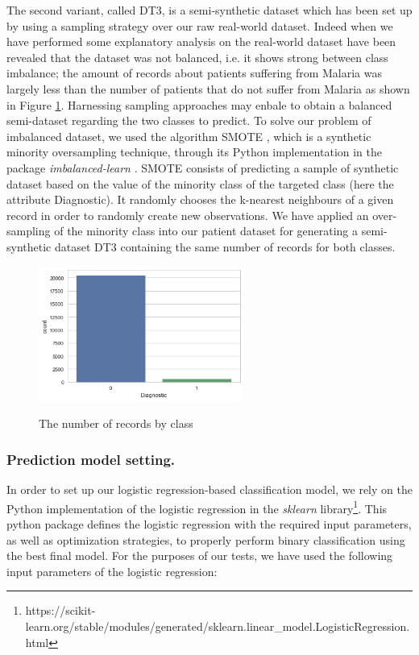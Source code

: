 The second variant, called \textsc{DT3}, is a semi-synthetic dataset which has been set up by using a 
sampling strategy over our raw real-world dataset. Indeed when we have performed some explanatory analysis 
on the real-world dataset have been revealed that the dataset was not balanced, i.e. it shows strong between
class imbalance; the amount of records about patients suffering from Malaria was largely less than the number
of patients that do not suffer from Malaria as shown in Figure \ref{records_class}. Harnessing sampling approaches may enbale to obtain a balanced 
semi-dataset regarding the two classes to predict. To solve our problem of imbalanced dataset, we used the 
algorithm SMOTE \cite{Wa06}, which is a synthetic minority oversampling technique, through its Python implementation
in the  package \emph{imbalanced-learn} \cite{Gu17}. SMOTE consists of predicting a sample of synthetic dataset based on 
the value of the minority class of the targeted class (here the attribute Diagnostic). It randomly chooses the k-nearest 
neighbours of a given record in order to randomly create new observations.
 We have applied an over-sampling of the minority class into our patient 
dataset for generating  a semi-synthetic dataset \textsc{DT3} containing the same number of records for both classes.  

\begin{figure}[h]
\centering
\includegraphics[width=0.6\textwidth]{images/imbalanced_dataset}
\label{records_class}\caption{The number of records by class}
\end{figure} 

\subsubsection{Prediction model setting.}
In order to set up our logistic regression-based classification model, we rely on the Python implementation of the logistic regression in the \emph{sklearn} library\footnote{https://scikit-learn.org/stable/modules/generated/sklearn.linear\_model.LogisticRegression.html}.
This python package defines the logistic regression with the required input parameters, as well as optimization strategies, to properly perform binary 
classification using the best final model. For the purposes of our tests, we have used the following input parameters of the logistic regression:

